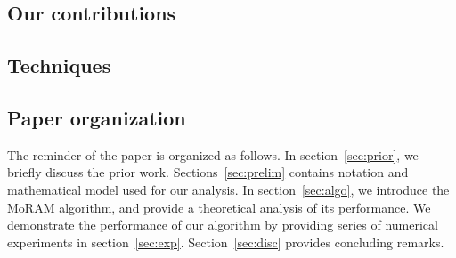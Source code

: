 \subsection{Our contributions}
\subsection{Techniques}
\subsection{Paper organization}
The reminder of the paper is organized as follows. In section~\ref{sec:prior}, we briefly discuss the prior work. Sections~\ref{sec:prelim} contains notation and mathematical model used for our analysis. In section~\ref{sec:algo}, we introduce the MoRAM algorithm, and provide a theoretical analysis of its performance. We demonstrate the performance of our algorithm by providing series of numerical experiments in section~\ref{sec:exp}. Section~\ref{sec:disc} provides concluding remarks.